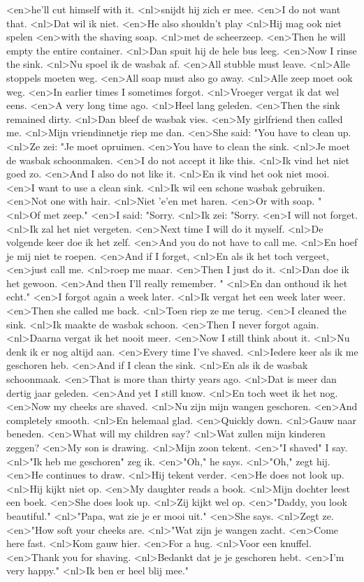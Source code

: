 <en>he'll cut himself with it.
<nl>snijdt hij zich er mee.
<en>I do not want that.
<nl>Dat wil ik niet.
<en>He also shouldn't play
<nl>Hij mag ook niet spelen
<en>with the shaving soap.
<nl>met de scheerzeep.
<en>Then he will empty the entire container.
<nl>Dan spuit hij de hele bus leeg.
<en>Now I rinse the sink.
<nl>Nu spoel ik de wasbak af.
<en>All stubble must leave.
<nl>Alle stoppels moeten weg.
<en>All soap must also go away.
<nl>Alle zeep moet ook weg.
<en>In earlier times I sometimes forgot.
<nl>Vroeger vergat ik dat wel eens.
<en>A very long time ago.
<nl>Heel lang geleden.
<en>Then the sink remained dirty.
<nl>Dan bleef de wasbak vies.
<en>My girlfriend then called me.
<nl>Mijn vriendinnetje riep me dan.
<en>She said: "You have to clean up.
<nl>Ze zei: "Je moet opruimen.
<en>You have to clean the sink.
<nl>Je moet de wasbak schoonmaken.
<en>I do not accept it like this.
<nl>Ik vind het niet goed zo.
<en>And I also do not like it.
<nl>En ik vind het ook niet mooi.
<en>I want to use a clean sink.
<nl>Ik wil een schone wasbak gebruiken.
<en>Not one with hair.
<nl>Niet 'e'en met haren.
<en>Or with soap. "
<nl>Of met zeep."
<en>I said: "Sorry.
<nl>Ik zei: "Sorry.
<en>I will not forget.
<nl>Ik zal het niet vergeten.
<en>Next time I will do it myself.
<nl>De volgende keer doe ik  het zelf.
<en>And you do not have to call me.
<nl>En hoef je mij niet te roepen.
<en>And if I forget,
<nl>En als ik het toch vergeet,
<en>just call me.
<nl>roep me maar.
<en>Then I just do it.
<nl>Dan doe ik het gewoon.
<en>And then I'll really remember. "
<nl>En dan onthoud ik het echt."
<en>I forgot again a week later.
<nl>Ik vergat het een week later weer.
<en>Then she called me back.
<nl>Toen riep ze me terug.
<en>I cleaned the sink.
<nl>Ik maakte de wasbak schoon.
<en>Then I never forgot again.
<nl>Daarna vergat ik het nooit meer.
<en>Now I still think about it.
<nl>Nu denk ik er nog altijd aan.
<en>Every time I've shaved.
<nl>Iedere keer als ik me geschoren heb.
<en>And if I clean the sink.
<nl>En als ik de wasbak schoonmaak.
<en>That is more than thirty years ago.
<nl>Dat is meer dan dertig jaar geleden.
<en>And yet I still know.
<nl>En toch weet ik het nog.
<en>Now my cheeks are shaved.
<nl>Nu zijn mijn wangen geschoren.
<en>And completely smooth.
<nl>En helemaal glad.
<en>Quickly down.
<nl>Gauw naar beneden.
<en>What will my children say?
<nl>Wat zullen mijn kinderen zeggen?
<en>My son is drawing.
<nl>Mijn zoon tekent.
<en>"I shaved" I say.
<nl>"Ik heb me geschoren" zeg ik.
<en>"Oh," he says.
<nl>"Oh," zegt hij.
<en>He continues to draw.
<nl>Hij tekent verder.
<en>He does not look up.
<nl>Hij kijkt niet op.
<en>My daughter reads a book.
<nl>Mijn dochter leest een boek.
<en>She does look up.
<nl>Zij kijkt wel op.
<en>"Daddy, you look beautiful."
<nl>"Papa, wat zie je er mooi uit."
<en>She says.
<nl>Zegt ze.
<en>"How soft your cheeks are.
<nl>"Wat zijn je wangen zacht.
<en>Come here fast.
<nl>Kom gauw hier.
<en>For a hug.
<nl>Voor een knuffel.
<en>Thank you for shaving.
<nl>Bedankt dat je je geschoren hebt.
<en>I'm very  happy."
<nl>Ik ben er heel blij mee."
